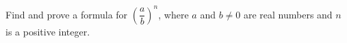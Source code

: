 Find and prove a formula for $\left(\dfrac {a}{b}\right)^n$, where $a$ and $b\ne0$ are real numbers and $n$ is a positive integer.
